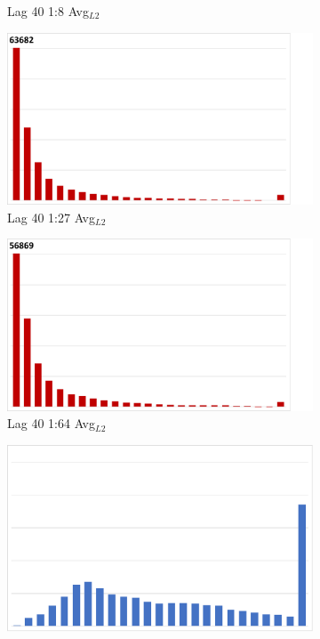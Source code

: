 \begin{figure}
\begin{subfigure}{0.195\textwidth}
\vspace{-2mm}
\caption{Lag 40 1:8 Avg$_{L2}$ }
\end{subfigure}
\begin{subfigure}{0.195\textwidth}
\centering
\includegraphics[width=0.9\linewidth, trim={0cm 0cm 2.5cm 0cm}, clip]{results/cloverleaf3d/lag_5/Lag5_AvgL2.pdf}
\vspace{-2mm}
\caption{Lag 40 1:27 Avg$_{L2}$ }
\end{subfigure}
\begin{subfigure}{0.195\textwidth}
\centering
\includegraphics[width=0.9\linewidth, trim={0cm 0cm 2.5cm 0cm}, clip]{results/cloverleaf3d/lag_6/Lag6_AvgL2.pdf}
\vspace{-2mm}
\caption{Lag 40 1:64 Avg$_{L2}$ }
\end{subfigure}
\begin{subfigure}{0.195\textwidth}
\centering
\includegraphics[width=0.9\linewidth]{results/cloverleaf3d/eul_1/Eul1_Max.pdf}

\end{subfigure}
\end{figure}

